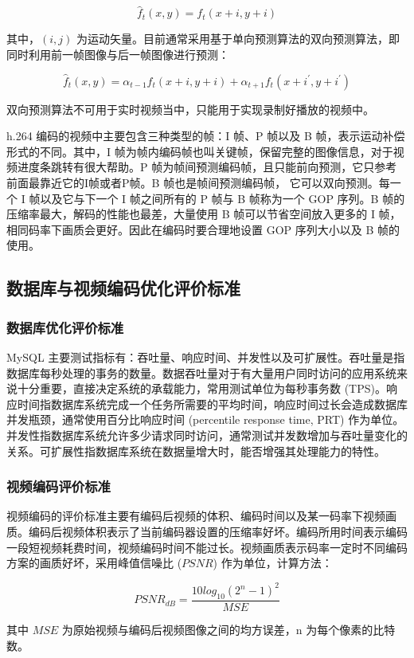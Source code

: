 \begin{equation}
\label{eq:forward_pre}
\hat{f}_{t}(x,y) = f_{t}(x+i, y+i)
\end{equation}

其中，$(i, j)$ 为运动矢量。目前通常采用基于单向预测算法的双向预测算法，即同时利用前一帧图像与后一帧图像进行预测：

\begin{equation}
\label{eq:forward_back_pre}
\hat{f}_{t}(x,y) = \alpha_{t-1}f_{t}(x+i, y+i) + \alpha_{t+1}f_{t}(x+i^{'}, y+i^{'})
\end{equation}

双向预测算法不可用于实时视频当中，只能用于实现录制好播放的视频中。

h.264 编码的视频中主要包含三种类型的帧：I 帧、P 帧以及 B 帧，表示运动补偿形式的不同。其中，I 帧为帧内编码帧也叫关键帧，保留完整的图像信息，对于视频进度条跳转有很大帮助。P 帧为帧间预测编码帧，且只能前向预测，它只参考前面最靠近它的I帧或者P帧。B 帧也是帧间预测编码帧， 它可以双向预测。每一个 I 帧以及它与下一个 I 帧之间所有的 P 帧与 B 帧称为一个 GOP 序列。B 帧的压缩率最大，解码的性能也最差，大量使用 B 帧可以节省空间放入更多的 I 帧，相同码率下画质会更好。因此在编码时要合理地设置 GOP 序列大小以及 B 帧的使用\cite{richardson2004h}。

\subsection{数据库与视频编码优化评价标准}
\subsubsection{数据库优化评价标准}
MySQL 主要测试指标有：吞吐量、响应时间、并发性以及可扩展性。吞吐量是指数据库每秒处理的事务的数量。数据吞吐量对于有大量用户同时访问的应用系统来说十分重要，直接决定系统的承载能力，常用测试单位为每秒事务数 (TPS)。响应时间指数据库系统完成一个任务所需要的平均时间，响应时间过长会造成数据库并发瓶颈，通常使用百分比响应时间 (percentile response time, PRT) 作为单位。并发性指数据库系统允许多少请求同时访问，通常测试并发数增加与吞吐量变化的关系。可扩展性指数据库系统在数据量增大时，能否增强其处理能力的特性\cite{schwartz2012high}。

\subsubsection{视频编码评价标准}

视频编码的评价标准主要有编码后视频的体积、编码时间以及某一码率下视频画质。编码后视频体积表示了当前编码器设置的压缩率好坏。编码所用时间表示编码一段短视频耗费时间，视频编码时间不能过长。视频画质表示码率一定时不同编码方案的画质好坏，采用峰值信噪比 ($PSNR$) 作为单位\cite{毕厚杰2005新一代视频压缩编码标准}，计算方法：

\begin{equation}
\label{eq:forward_back_pre}
PSNR_{dB} = \frac{10log_{10}(2^{n} - 1)^{2}}{MSE}
\end{equation}

其中 $MSE$ 为原始视频与编码后视频图像之间的均方误差，n 为每个像素的比特数。







